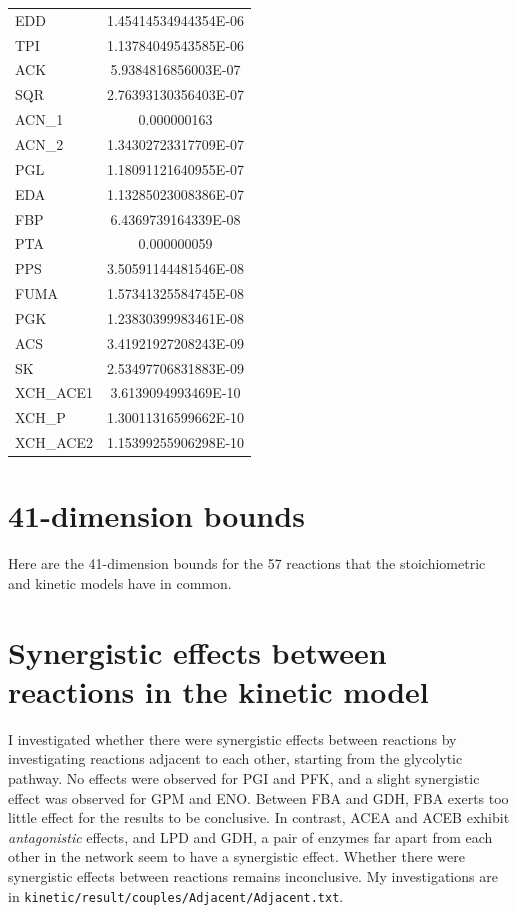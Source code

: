 \documentclass[parskip=full, numbers=noenddot]{scrreprt}
\begin{document}
\begin{longtable}{lS}
EDD & 1.45414534944354E-06\\
TPI & 1.13784049543585E-06\\
ACK & 5.9384816856003E-07\\
SQR & 2.76393130356403E-07\\
ACN\_1 & 0.000000163\\
ACN\_2 & 1.34302723317709E-07\\
PGL & 1.18091121640955E-07\\
EDA & 1.13285023008386E-07\\
FBP & 6.4369739164339E-08\\
PTA & 0.000000059\\
PPS & 3.50591144481546E-08\\
FUMA & 1.57341325584745E-08\\
PGK & 1.23830399983461E-08\\
ACS & 3.41921927208243E-09\\
SK & 2.53497706831883E-09\\
XCH\_ACE1 & 3.6139094993469E-10\\
XCH\_P & 1.30011316599662E-10\\
XCH\_ACE2 & 1.15399255906298E-10\\
\bottomrule
\end{longtable}

\section{41-dimension bounds}
\label{ap:41dbounds}

Here are the 41-dimension bounds for the 57 reactions that the stoichiometric and kinetic models have in common.


\section{Synergistic effects between reactions in the kinetic model}
\label{ap:synergistic}

I investigated whether there were synergistic effects between reactions by investigating reactions adjacent to each other, starting from the glycolytic pathway. No effects were observed for PGI and PFK, and a slight synergistic effect was observed for GPM and ENO. Between FBA and GDH, FBA exerts too little effect for the results to be conclusive. In contrast, ACEA and ACEB exhibit \emph{antagonistic} effects, and LPD and GDH, a pair of enzymes far apart from each other in the network seem to have a synergistic effect. Whether there were synergistic effects between reactions remains inconclusive. My investigations are in \texttt{kinetic/result/couples/Adjacent/Adjacent.txt}.

\printbibliography
\end{document}
